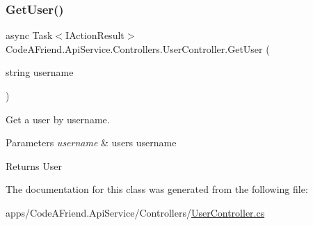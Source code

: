 \subsubsection{\texorpdfstring{Get\+User()}{GetUser()}}
{\footnotesize\ttfamily async Task$<$I\+Action\+Result$>$ Code\+A\+Friend.\+Api\+Service.\+Controllers.\+User\+Controller.\+Get\+User (\begin{DoxyParamCaption}\item[{string}]{username }\end{DoxyParamCaption})}



Get a user by username. 


\begin{DoxyParams}{Parameters}
{\em username} & user\textquotesingle{}s username\\
\hline
\end{DoxyParams}
\begin{DoxyReturn}{Returns}
User
\end{DoxyReturn}


The documentation for this class was generated from the following file\+:\begin{DoxyCompactItemize}
\item 
apps/\+Code\+A\+Friend.\+Api\+Service/\+Controllers/\mbox{\hyperlink{_user_controller_8cs}{User\+Controller.\+cs}}\end{DoxyCompactItemize}
